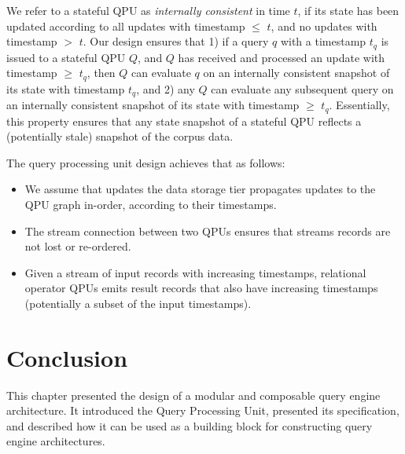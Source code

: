 We refer to a stateful QPU as \textit{internally consistent} in time $t$,
if its state has been updated according to all updates with timestamp $\leq$ $t$, and no updates with timestamp $>$ $t$.
Our design ensures that 1) if a query $q$ with a timestamp $t_q$ is issued to a stateful QPU $Q$,
and $Q$ has received and processed an update with timestamp $\geq$ $t_q$,
then $Q$ can evaluate $q$ on an internally consistent snapshot of its state with timestamp $t_q$,
and 2) any $Q$ can evaluate any subsequent query on an internally consistent snapshot of its state with timestamp $\geq$ $t_q$.
Essentially, this property ensures that any state snapshot of a stateful QPU reflects a (potentially stale) snapshot
of the corpus data.

The query processing unit design achieves that as follows:
\begin{itemize}
  \item We assume that updates the data storage tier propagates updates to the QPU graph in-order, according to their timestamps.

  \item The stream connection between two QPUs ensures that streams records are not lost or re-ordered.

  \item Given a stream of input records with increasing timestamps,
  relational operator QPUs emits result records that also have increasing timestamps (potentially a subset of the input timestamps).
\end{itemize}

\section{Conclusion}
This chapter presented the design of a modular and composable query engine architecture.
It introduced the Query Processing Unit, presented its specification,
and described how it can be used as a building block for constructing query engine architectures.


